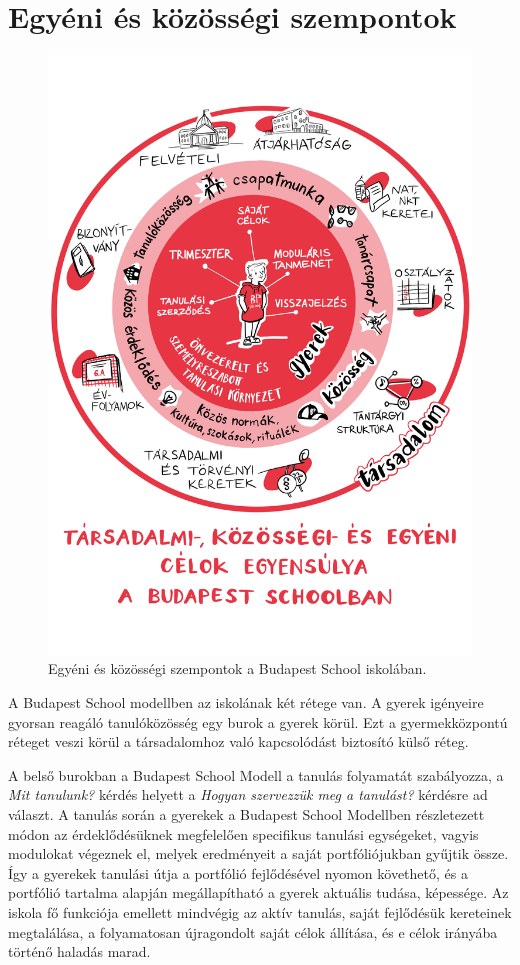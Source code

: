 \hypertarget{egyeni-es-kozossegi-szempontok}{%
\section{Egyéni és közösségi
szempontok}\label{egyeni-es-kozossegi-szempontok}}

\begin{figure}
\centering
\includegraphics{pics/celok_egyensulya.jpg}
\caption{Egyéni és közösségi szempontok a Budapest School iskolában.}
\end{figure}

A Budapest School modellben az iskolának két rétege van. A gyerek
igényeire gyorsan reagáló tanulóközösség egy burok a gyerek körül. Ezt a
gyermekközpontú réteget veszi körül a társadalomhoz való kapcsolódást
biztosító külső réteg.

A belső burokban a Budapest School Modell a tanulás folyamatát
szabályozza, a \emph{Mit tanulunk?} kérdés helyett a \emph{Hogyan
szervezzük meg a tanulást?} kérdésre ad választ. A tanulás során a
gyerekek a Budapest School Modellben részletezett módon az
érdeklődésüknek megfelelően specifikus tanulási egységeket, vagyis
modulokat végeznek el, melyek eredményeit a saját portfóliójukban
gyűjtik össze. Így a gyerekek tanulási útja a portfólió fejlődésével
nyomon követhető, és a portfólió tartalma alapján megállapítható a
gyerek aktuális tudása, képessége. Az iskola fő funkciója emellett
mindvégig az aktív tanulás, saját fejlődésük kereteinek megtalálása, a
folyamatosan újragondolt saját célok állítása, és e célok irányába
történő haladás marad.

